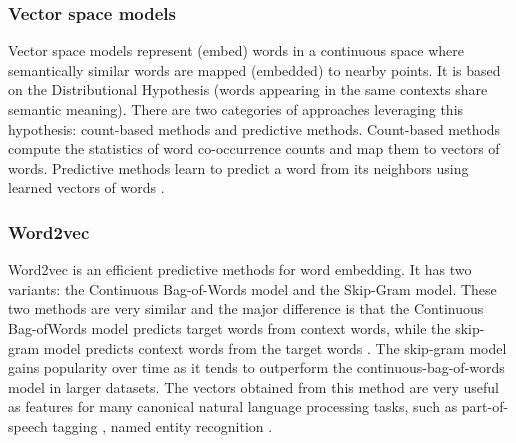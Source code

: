 \subsubsection{Vector space models}
Vector space models represent (embed) words in a continuous space where semantically similar words are mapped (embedded) to nearby points.
It is based on the Distributional Hypothesis (words appearing in the same contexts share semantic meaning).
There are two categories of approaches leveraging this hypothesis: count-based methods and predictive methods.
Count-based methods compute the statistics of word co-occurrence counts and map them to vectors of words. Predictive methods learn to predict a word from its neighbors using learned vectors of words \cite{baroni2014don}.

\subsubsection{Word2vec}
Word2vec is an efficient predictive methods for word embedding. It has two variants: the Continuous Bag-of-Words model and the Skip-Gram model.
These two methods are very similar and the major difference is that the Continuous Bag-ofWords model predicts target words from context words, while the skip-gram model predicts context words from the target words \cite{levy2014dependency}.
The skip-gram model gains popularity over time as it tends to outperform the continuous-bag-of-words model in larger datasets.
The vectors obtained from this method are very useful as features for many canonical natural language processing tasks, such as part-of-speech tagging \cite{collobert2011natural}, named entity recognition \cite{turian2010word}.

